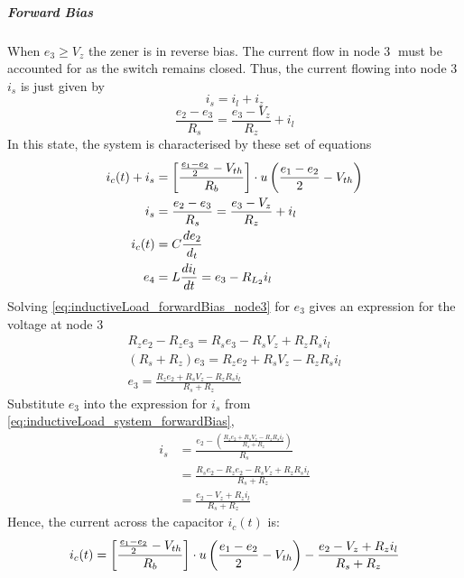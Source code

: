 \subparagraph{Forward Bias}
When $e_3 \geq V_z$ the zener is in reverse bias. The current flow in node \textcircled{3} must be accounted for as the switch remains closed. Thus, the current flowing into node \textcircled{3} $i_s$ is just given by $$i_s = i_l + i_z$$
\begin{equation}
	\frac{e_2 - e_3}{R_s} = \frac{e_3 - V_z}{R_z} + i_l
	\label{eq:inductiveLoad_forwardBias_node3}
\end{equation}
In this state, the system is characterised by these set of equations
\begin{equation}
	\begin{split}
		i_c(t) + i_s &= \left[\frac{\frac{e_1 - e_2}{2} - V_{th}}{R_b} \right]\cdot u\left(\frac{e_1 - e_2}{2} - V_{th} \right) \\
		i_s &= \frac{e_2 - e_3}{R_s} = \frac{e_3 - V_z}{R_z} + i_l \\
		i_c(t) &= C \frac{de_2}{d_t} \\
		e_4 &= L\frac{di_l}{dt} = e_3 - R_{L_2}i_l
	\end{split}
	\label{eq:inductiveLoad_system_forwardBias}
\end{equation}
Solving \eqref{eq:inductiveLoad_forwardBias_node3} for $e_3$ gives an expression for the voltage at node \textcircled{3}
\begin{equation}
	\begin{split}
		R_z e_2 - R_z e_3 = R_s e_3 - R_s V_z + R_z R_s i_l \\
		(R_s + R_z) e_3 = R_z e_2 + R_s V_z - R_z R_s i_l \\
		e_3 = \frac{R_z e_2 + R_s V_z - R_z R_s i_l}{R_s + R_z}
	\end{split}
	\label{eq:inductiveLoad_forwardBias_e3}
\end{equation}
Substitute $e_3$ into the expression for $i_s$ from \eqref{eq:inductiveLoad_system_forwardBias},
\begin{equation}
	\begin{split}
		i_s &= \frac{e_2 - \left(\frac{R_z e_2 + R_s V_z - R_z R_s i_l}{R_s + R_z}\right)}{R_s} \\
		    &= \frac{R_s e_2 - R_z e_2 - R_s V_z + R_z R_s i_l}{R_s + R_z} \\
		    &= \frac{e_2 - V_z + R_z i_l}{R_s + R_z}
	\end{split}
\end{equation}
Hence, the current across the capacitor $i_c(t)$ is:
\begin{equation}
	i_c(t) = \left[\frac{\frac{e_1 - e_2}{2} - V_{th}}{R_b} \right]\cdot u\left(\frac{e_1 - e_2}{2} - V_{th} \right) - \frac{e_2 - V_z + R_z i_l}{R_s + R_z}
\end{equation}
